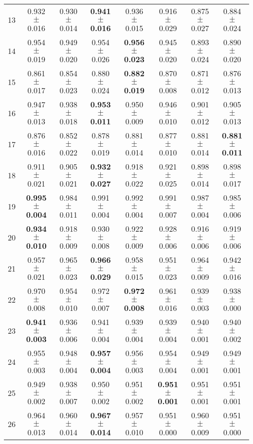 \begin{table}[!ht]
{\begin{tabular}{r c c c c c c c}
13 & 0.932 $\pm$ 0.016 & 0.930 $\pm$ 0.014 & \textbf{0.941 $\pm$ 0.016} & 0.936 $\pm$ 0.015 & 0.916 $\pm$ 0.029 & 0.875 $\pm$ 0.027 & 0.884 $\pm$ 0.024 \\
14 & 0.954 $\pm$ 0.019 & 0.949 $\pm$ 0.020 & 0.954 $\pm$ 0.026 & \textbf{0.956 $\pm$ 0.023} & 0.945 $\pm$ 0.020 & 0.893 $\pm$ 0.024 & 0.890 $\pm$ 0.020 \\
15 & 0.861 $\pm$ 0.017 & 0.854 $\pm$ 0.023 & 0.880 $\pm$ 0.024 & \textbf{0.882 $\pm$ 0.019} & 0.870 $\pm$ 0.008 & 0.871 $\pm$ 0.012 & 0.876 $\pm$ 0.013 \\
16 & 0.947 $\pm$ 0.013 & 0.938 $\pm$ 0.018 & \textbf{0.953 $\pm$ 0.011} & 0.950 $\pm$ 0.009 & 0.946 $\pm$ 0.010 & 0.901 $\pm$ 0.012 & 0.905 $\pm$ 0.013 \\
17 & 0.876 $\pm$ 0.016 & 0.852 $\pm$ 0.022 & 0.878 $\pm$ 0.019 & 0.881 $\pm$ 0.014 & 0.877 $\pm$ 0.010 & 0.881 $\pm$ 0.014 & \textbf{0.881 $\pm$ 0.011} \\
18 & 0.911 $\pm$ 0.021 & 0.905 $\pm$ 0.021 & \textbf{0.932 $\pm$ 0.027} & 0.918 $\pm$ 0.022 & 0.921 $\pm$ 0.025 & 0.898 $\pm$ 0.014 & 0.898 $\pm$ 0.017 \\
19 & \textbf{0.995 $\pm$ 0.004} & 0.984 $\pm$ 0.011 & 0.991 $\pm$ 0.004 & 0.992 $\pm$ 0.004 & 0.991 $\pm$ 0.007 & 0.987 $\pm$ 0.004 & 0.985 $\pm$ 0.006 \\
20 & \textbf{0.934 $\pm$ 0.010} & 0.918 $\pm$ 0.009 & 0.930 $\pm$ 0.008 & 0.922 $\pm$ 0.009 & 0.928 $\pm$ 0.006 & 0.916 $\pm$ 0.006 & 0.919 $\pm$ 0.006 \\
21 & 0.957 $\pm$ 0.021 & 0.965 $\pm$ 0.023 & \textbf{0.966 $\pm$ 0.029} & 0.958 $\pm$ 0.015 & 0.951 $\pm$ 0.023 & 0.964 $\pm$ 0.009 & 0.942 $\pm$ 0.016 \\
22 & 0.970 $\pm$ 0.008 & 0.954 $\pm$ 0.010 & 0.972 $\pm$ 0.007 & \textbf{0.972 $\pm$ 0.008} & 0.961 $\pm$ 0.016 & 0.939 $\pm$ 0.003 & 0.938 $\pm$ 0.000 \\
23 & \textbf{0.941 $\pm$ 0.003} & 0.936 $\pm$ 0.006 & 0.941 $\pm$ 0.004 & 0.939 $\pm$ 0.004 & 0.939 $\pm$ 0.004 & 0.940 $\pm$ 0.001 & 0.940 $\pm$ 0.002 \\
24 & 0.955 $\pm$ 0.003 & 0.948 $\pm$ 0.004 & \textbf{0.957 $\pm$ 0.004} & 0.956 $\pm$ 0.003 & 0.954 $\pm$ 0.004 & 0.949 $\pm$ 0.001 & 0.949 $\pm$ 0.001 \\
25 & 0.949 $\pm$ 0.002 & 0.938 $\pm$ 0.007 & 0.950 $\pm$ 0.002 & 0.951 $\pm$ 0.002 & \textbf{0.951 $\pm$ 0.001} & 0.951 $\pm$ 0.001 & 0.951 $\pm$ 0.001 \\
26 & 0.964 $\pm$ 0.013 & 0.960 $\pm$ 0.014 & \textbf{0.967 $\pm$ 0.014} & 0.957 $\pm$ 0.010 & 0.951 $\pm$ 0.000 & 0.960 $\pm$ 0.009 & 0.951 $\pm$ 0.000 \\

\end{tabular}}
\end{table}
